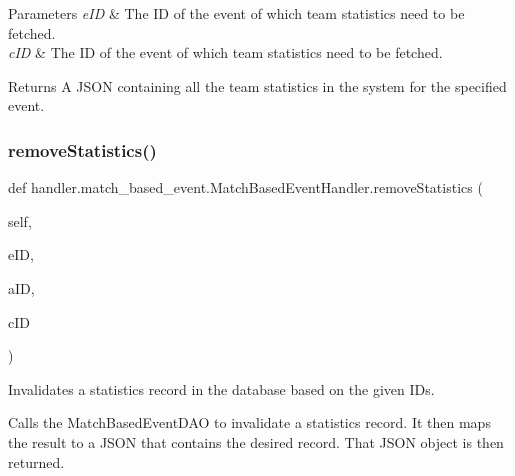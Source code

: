 \begin{DoxyParams}{Parameters}
{\em e\+ID} & The ID of the event of which team statistics need to be fetched. \\
\hline
{\em c\+ID} & The ID of the event of which team statistics need to be fetched.\\
\hline
\end{DoxyParams}
\begin{DoxyReturn}{Returns}
A J\+S\+ON containing all the team statistics in the system for the specified event. 
\end{DoxyReturn}
\mbox{\label{classhandler_1_1match__based__event_1_1_match_based_event_handler_abc2931afa97bddacd2ef59b1f3542b56}} 
\subsubsection{\texorpdfstring{remove\+Statistics()}{removeStatistics()}}
{\footnotesize\ttfamily def handler.\+match\+\_\+based\+\_\+event.\+Match\+Based\+Event\+Handler.\+remove\+Statistics (\begin{DoxyParamCaption}\item[{}]{self,  }\item[{}]{e\+ID,  }\item[{}]{a\+ID,  }\item[{}]{c\+ID }\end{DoxyParamCaption})}



Invalidates a statistics record in the database based on the given I\+Ds. 

Calls the Match\+Based\+Event\+D\+AO to invalidate a statistics record. It then maps the result to a J\+S\+ON that contains the desired record. That J\+S\+ON object is then returned.


